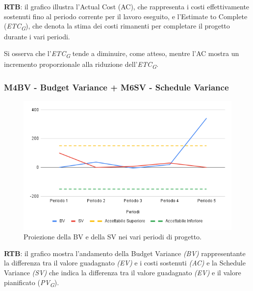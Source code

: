 \vspace{0.2cm}

\textbf{RTB}: il grafico illustra l'Actual Cost (AC), che rappresenta i costi effettivamente sostenuti fino al periodo corrente per il lavoro eseguito, e l'Estimate to Complete (\textit{ETC}\textsubscript{\textit{G}}), che denota la stima dei costi rimanenti per completare il progetto durante i vari periodi.

\vspace{0.2cm}

Si osserva che l'\textit{ETC}\textsubscript{\textit{G}} tende a diminuire, come atteso, mentre l'AC mostra un incremento proporzionale alla riduzione dell'\textit{ETC}\textsubscript{\textit{G}}.

\subsubsection{M4BV - Budget Variance + M6SV - Schedule Variance}

\vspace{0.3cm}

\begin{figure}[H]
    \centering
    \includegraphics[width=1\textwidth]{../Images/PianoDiQualifica/BV_SV.png}
    \caption{Proiezione della BV e della SV nei vari periodi di progetto.}
    \label{fig:5}
\end{figure}

\vspace{0.2cm}

\textbf{RTB}: il grafico mostra l'andamento della Budget Variance \textit{(BV)} rappresentante la differenza tra il valore guadagnato \textit{(EV)} e i costi sostenuti \textit{(AC)} e la Schedule Variance \textit{(SV)} che indica la differenza tra il valore guadagnato \textit{(EV)} e il valore pianificato (\textit{PV}\textsubscript{\textit{G}}).

